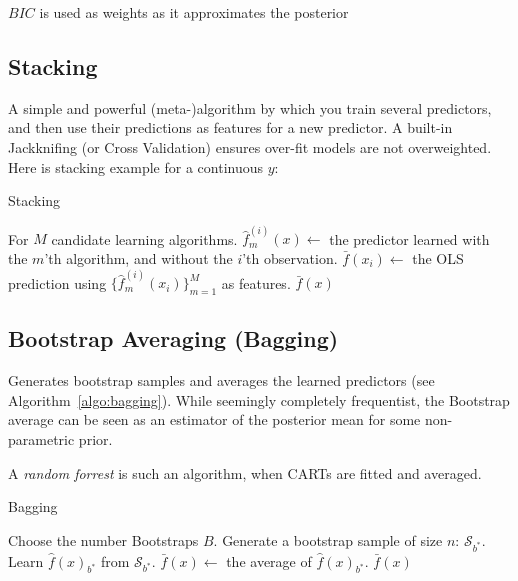 \documentclass[12pt,a4paper]{article}
\theoremstyle{plain}
\theoremstyle{definition}
\newcommand{\hyp}{f}
\newcommand{\ensembleSize}{M}
\newcommand{\ensembleInd}{m}
\newcommand{\sample}{\mathcal{S}}
\newcommand{\bootstraps}{B} %
\newcommand{\bootstrap}{{b^*}}
\begin{document}
$BIC$ is used as weights as it approximates the posterior 



\subsection{Stacking}
A simple and powerful (meta-)algorithm by which you train several predictors, and then use their predictions as features for a new predictor. 
A built-in Jackknifing (or Cross Validation) ensures over-fit models are not overweighted.
Here is  stacking example for a continuous $y$:

\begin{algorithm}[H]
\caption{Stacking}
\label{algo:stacking}
\begin{algorithmic}
\State For $\ensembleSize$ candidate learning algorithms.
	\For{$ \ensembleInd \in 1,\dots \ensembleSize $}
		\State $\hat{\hyp}^{(i)}_\ensembleInd(x) \gets$ the predictor learned with the $\ensembleInd$'th algorithm, and without the $i$'th observation.
	\EndFor
\EndFor
\State $\bar{\hyp}(x_i) \gets$ the OLS prediction using $\{ \hat{\hyp}^{(i)}_\ensembleInd(x_i)\}_{\ensembleInd=1}^\ensembleSize$ as features. 
\State \Return $\bar{\hyp}(x)$
\end{algorithmic}
\end{algorithm}



\subsection{Bootstrap Averaging (Bagging)}

Generates bootstrap samples and averages the learned predictors (see Algorithm~\ref{algo:bagging}). 
While seemingly completely frequentist, the Bootstrap average can be seen as an estimator of the posterior mean for some non-parametric prior.

A \emph{random forrest} is such an algorithm, when CARTs are fitted and averaged. 


\begin{algorithm}[H]
\caption{Bagging}
\label{algo:bagging}
\begin{algorithmic}
\State Choose the number Bootstraps $\bootstraps$.
\For{$ \bootstrap \in 1,\dots,\bootstraps$}
	\State Generate a bootstrap sample of size $n$: $\sample_\bootstrap$.
	\State Learn $\hat{\hyp}(x)_{\bootstrap}$ from $\sample_\bootstrap$.
\EndFor
\State $\bar{\hyp}(x) \gets$ the average of $\hat{\hyp}(x)_{\bootstrap}$.
\State \Return $\bar{\hyp}(x)$
\end{algorithmic}
\end{algorithm}
\end{document}
